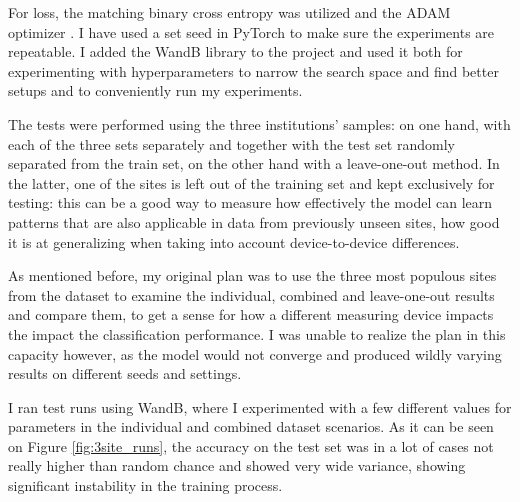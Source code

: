 	For loss, the matching binary cross entropy was utilized and the ADAM optimizer \cite{kingma2014adam}. I have used a set seed in PyTorch to make sure the experiments are repeatable. I added the WandB library to the project and used it both for experimenting with hyperparameters to narrow the search space and find better setups and to conveniently run my experiments.
	
	The tests were performed using the three institutions' samples: on one hand, with each of the three sets separately and together with the test set randomly separated from the train set, on the other hand with a leave-one-out method. In the latter, one of the sites is left out of the training set and kept exclusively for testing: this can be a good way to measure how effectively the model can learn patterns that are also applicable in data from previously unseen sites, how good it is at generalizing when taking into account device-to-device differences.
	
	As mentioned before, my original plan was to use the three most populous sites from the dataset to examine the individual, combined and leave-one-out results and compare them, to get a sense for how a different measuring device impacts the impact the classification performance. I was unable to realize the plan in this capacity however, as the model would not converge and produced wildly varying results on different seeds and settings. 
	
	I ran test runs using WandB, where I experimented with a few different values for parameters in the individual and combined dataset scenarios. As it can be seen on Figure \ref{fig:3site_runs}, the accuracy on the test set was in a lot of cases not really higher than random chance and showed very wide variance, showing significant instability in the training process.
	

